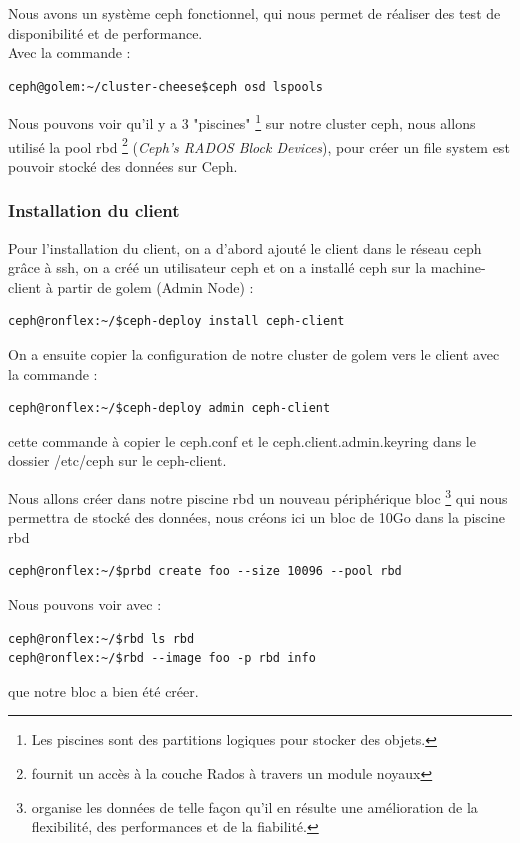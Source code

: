 \documentclass[12pt]{article}
\begin{document}
Nous avons un système ceph fonctionnel, qui nous permet de réaliser des test de disponibilité et de performance.
\\Avec la commande :
\begin{verbatim}
ceph@golem:~/cluster-cheese$ceph osd lspools
\end{verbatim}

Nous pouvons voir qu'il y a 3 "piscines" \footnote{Les piscines sont des partitions logiques pour stocker des objets.} sur notre cluster ceph, nous allons utilisé la pool rbd \footnote{fournit un accès à la couche Rados à travers un module noyaux} (\textit{Ceph’s RADOS Block Devices}), pour créer un file system est pouvoir stocké des données sur Ceph.

\subsubsection{Installation du client}
Pour l'installation du client, on a d'abord ajouté le client dans le réseau ceph grâce à ssh, on a créé un utilisateur ceph et on a installé ceph sur la machine-client à partir de golem (Admin Node) :
\begin{verbatim}
ceph@ronflex:~/$ceph-deploy install ceph-client
\end{verbatim}

On a ensuite copier la configuration de notre cluster de golem vers le client avec la commande : 
\begin{verbatim}
ceph@ronflex:~/$ceph-deploy admin ceph-client
\end{verbatim}

cette commande à copier le ceph.conf et le ceph.client.admin.keyring dans le dossier /etc/ceph sur le ceph-client.

Nous allons créer dans notre piscine rbd un nouveau périphérique bloc \footnote{organise les données de telle façon qu'il en résulte une amélioration de la flexibilité, des performances et de la fiabilité.} qui nous permettra de stocké des données, nous créons ici un bloc de 10Go dans la piscine rbd
\begin{verbatim}
ceph@ronflex:~/$prbd create foo --size 10096 --pool rbd
\end{verbatim}

Nous pouvons voir avec : 
\begin{verbatim}
ceph@ronflex:~/$rbd ls rbd 
ceph@ronflex:~/$rbd --image foo -p rbd info 
\end{verbatim}

que notre bloc a bien été créer.
\end{document}
